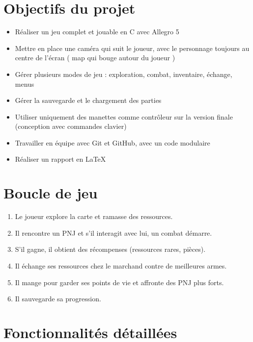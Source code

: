 \documentclass[11pt,a4paper]{article}
\begin{document}
\section{Objectifs du projet}

\begin{itemize}
    \item Réaliser un jeu complet et jouable en C avec Allegro 5
    \item Mettre en place une caméra qui suit le joueur, avec le personnage toujours au centre de l'écran ( map qui bouge autour du joueur )
    \item Gérer plusieurs modes de jeu : exploration, combat, inventaire, échange, menus
    \item Gérer la sauvegarde et le chargement des parties
    \item Utiliser uniquement des manettes comme contrôleur sur la version finale (conception avec commandes clavier)
    \item Travailler en équipe avec Git et GitHub, avec un code modulaire
    \item Réaliser un rapport en LaTeX
\end{itemize}

\section{Boucle de jeu}

\begin{enumerate}
    \item Le joueur explore la carte et ramasse des ressources.
    \item Il rencontre un PNJ et s'il interagit avec lui, un combat démarre.
    \item S'il gagne, il obtient des récompenses (ressources rares, pièces).
    \item Il échange ses ressources chez le marchand contre de meilleures armes.
    \item Il mange pour garder ses points de vie et affronte des PNJ plus forts.
    \item Il sauvegarde sa progression.
\end{enumerate}

\section{Fonctionnalités détaillées}
\end{document}

